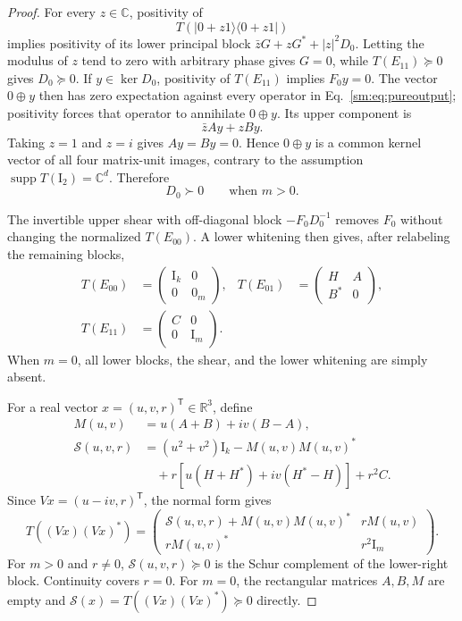 \documentclass[aps,prl,reprint,superscriptaddress,nofootinbib]{revtex4-2}
\newcommand{\I}{\mathrm{I}}
\newcommand{\C}{\mathbb C}
\newcommand{\supp}{\operatorname{supp}}
\newcommand{\cS}{\mathcal S}
\begin{document}
\begin{proof}
For every \(z\in\C\), positivity of
\begin{equation}
 T(|0+z1\rangle\langle0+z1|)
\label{sm:eq:pureoutput}
\end{equation}
implies positivity of its lower principal block
\(\bar zG+zG^*+|z|^2D_0\).  Letting the modulus of \(z\) tend to zero
with arbitrary phase gives \(G=0\), while \(T(E_{11})\succeq0\) gives
\(D_0\succeq0\).  If \(y\in\ker D_0\), positivity of \(T(E_{11})\)
implies \(F_0y=0\).  The vector \(0\oplus y\) then has zero expectation
against every operator in Eq.~\eqref{sm:eq:pureoutput}; positivity forces
that operator to annihilate \(0\oplus y\).  Its upper component is
\begin{equation}
 \bar zAy+zBy.
\label{sm:eq:uppercomponent}
\end{equation}
Taking \(z=1\) and \(z=i\) gives \(Ay=By=0\).  Hence
\(0\oplus y\) is a common kernel vector of all four matrix-unit images,
contrary to the assumption $\supp T(\I_2)=\C^d$.  Therefore
\begin{equation}
 D_0\succ0\qquad\text{when }m>0.
\label{sm:eq:Dpositive}
\end{equation}

The invertible upper shear with off-diagonal block
\(-F_0D_0^{-1}\) removes \(F_0\) without changing the normalized
\(T(E_{00})\).  A lower whitening then gives, after relabeling the
remaining blocks,
\begin{align}
 T(E_{00})&=\begin{pmatrix}\I_k&0\\0&0_m\end{pmatrix},&
 T(E_{01})&=\begin{pmatrix}H&A\\B^*&0\end{pmatrix},
\nonumber\\
 T(E_{11})&=\begin{pmatrix}C&0\\0&\I_m\end{pmatrix}.
\label{sm:eq:normalform}
\end{align}
When \(m=0\), all lower blocks, the shear, and the lower whitening are
simply absent.

For a real vector \(x=(u,v,r)^{\mathsf T}\in\mathbb R^3\), define
\begin{align}
 M(u,v)&=u(A+B)+iv(B-A),
\label{sm:eq:Muv}\\
 \cS(u,v,r)
 &=(u^2+v^2)\I_k-M(u,v)M(u,v)^*
\nonumber\\
 &\quad+r\left[u(H+H^*)+iv(H^*-H)\right]+r^2C.
\label{sm:eq:Suvr}
\end{align}
Since \(Vx=(u-iv,r)^{\mathsf T}\), the normal form gives
\begin{equation}
 T((Vx)(Vx)^*)=
 \begin{pmatrix}
 \cS(u,v,r)+M(u,v)M(u,v)^*&rM(u,v)\\
 rM(u,v)^*&r^2\I_m
 \end{pmatrix}.
\label{sm:eq:pureoutputnormal}
\end{equation}
For \(m>0\) and \(r\neq0\), \(\cS(u,v,r)\succeq0\) is the Schur
complement of the lower-right block.  Continuity covers \(r=0\).  For
\(m=0\), the rectangular matrices \(A,B,M\) are empty and
\(\cS(x)=T((Vx)(Vx)^*)\succeq0\) directly.


\end{proof}
\end{document}
